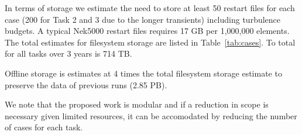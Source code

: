 In terms of storage we estimate the need to store at least 50 restart files for each case (200 for Task 2 and 3 due to the longer transients) including turbulence budgets. A typical Nek5000 restart files requires 17 GB per 1,000,000 elements. The total estimates for filesystem storage are listed in Table~\ref{tab:cases}. To total for all tasks over 3 years is 714 TB.

Offline storage is estimates at 4 times the total filesystem storage estimate to preserve the  data of previous runs (2.85 PB).

We note that the proposed work is modular and if a reduction in scope is necessary given limited resources,  it can be accomodated by reducing the number of cases for each task.



